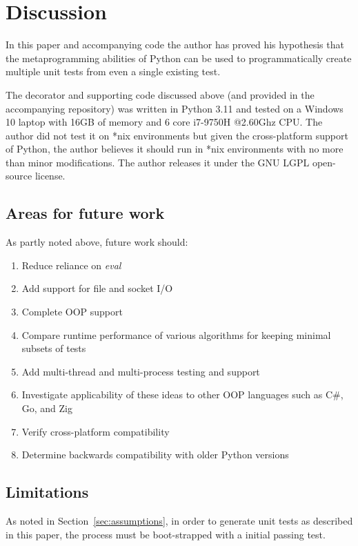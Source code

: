 \section{Discussion}\label{sec:discussion}

In this paper and accompanying code the author
has proved his hypothesis that the metaprogramming abilities of 
Python can be used to programmatically create multiple 
unit tests from even a single existing test.

The decorator and supporting code discussed above
(and provided in the accompanying repository)
was written in Python 3.11 and tested on a 
Windows 10 laptop with 16GB of memory and 6 core i7-9750H @2.60Ghz CPU.
The author did not test it on *nix environments but given the
cross-platform support of Python, the author believes it should run in *nix 
environments with no more than minor modifications. The author releases it
under the GNU LGPL open-source license.

\subsection{Areas for future work}\label{sec:tuning-2}
As partly noted above, future work should: 
\begin{enumerate}
  \item Reduce reliance on \textit{eval}
  \item Add support for file and socket I/O
  \item Complete OOP support
  \item Compare runtime performance of various algorithms for keeping minimal subsets of tests
  \item Add multi-thread and multi-process testing and support
  \item Investigate applicability of these ideas to other OOP languages such as C\#, Go, and Zig
  \item Verify cross-platform compatibility
  \item Determine backwards compatibility with older Python versions
\end{enumerate}

\subsection{Limitations}\label{sec:limitations}
As noted in Section~\ref{sec:assumptions}, in order to 
generate unit tests as described in this paper, the 
process must be boot-strapped with a initial passing test.

